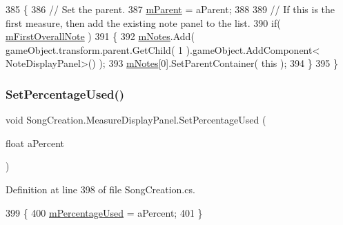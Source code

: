 \begin{DoxyCode}
385         \{
386             \textcolor{comment}{// Set the parent.}
387             \hyperlink{class_song_creation_1_1_measure_display_panel_a997c583ac0b9687ff9399c9ed27d0dcb}{mParent} = aParent;
388 
389             \textcolor{comment}{// If this is the first measure, then add the existing note panel to the list.}
390             \textcolor{keywordflow}{if}( \hyperlink{class_song_creation_1_1_measure_display_panel_a3794bf2a605eaa0595e6c6e41f5b458c}{mFirstOverallNote} )
391             \{
392                 \hyperlink{class_song_creation_1_1_measure_display_panel_a096dfc8481f3defcdcb57bfc140ac953}{mNotes}.Add( gameObject.transform.parent.GetChild( 1 ).gameObject.AddComponent<
      NoteDisplayPanel>() );
393                 \hyperlink{class_song_creation_1_1_measure_display_panel_a096dfc8481f3defcdcb57bfc140ac953}{mNotes}[0].SetParentContainer( \textcolor{keyword}{this} );
394             \}
395         \}
\end{DoxyCode}
\mbox{\label{class_song_creation_1_1_measure_display_panel_a0efb19869f0c34cae1a617fe7c5880d5}} 
\subsubsection{\texorpdfstring{Set\+Percentage\+Used()}{SetPercentageUsed()}}
{\footnotesize\ttfamily void Song\+Creation.\+Measure\+Display\+Panel.\+Set\+Percentage\+Used (\begin{DoxyParamCaption}\item[{float}]{a\+Percent }\end{DoxyParamCaption})}



Definition at line 398 of file Song\+Creation.\+cs.


\begin{DoxyCode}
399         \{
400             \hyperlink{class_song_creation_1_1_measure_display_panel_a87241a464e8e3ed8ad9011fcebaec50a}{mPercentageUsed} = aPercent;
401         \}
\end{DoxyCode}
\mbox{\label{class_song_creation_1_1_measure_display_panel_a77bbca4dc7add6b1e33394834e40cdde}} 
